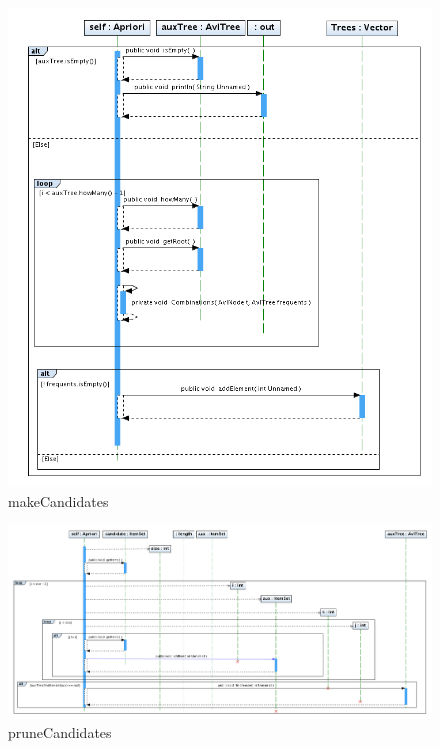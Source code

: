 \begin{figure}
\includegraphics[width=1.2\textwidth]{Apriori/makeCandidates.png}
\caption{makeCandidates}
\end{figure}
\newpage
\begin{figure}
\includegraphics[width=1.2\textwidth]{Apriori/pruneCandidates.png}
\caption{pruneCandidates}
\end{figure}
\newpage




